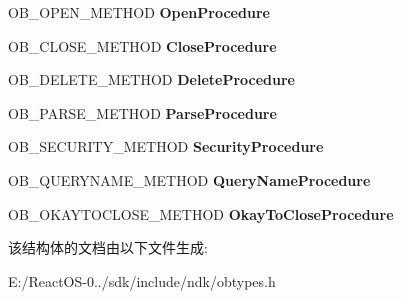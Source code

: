\begin{DoxyCompactItemize}
O\+B\+\_\+\+O\+P\+E\+N\+\_\+\+M\+E\+T\+H\+OD {\bfseries Open\+Procedure}
\item 
\mbox{\label{struct___o_b_j_e_c_t___t_y_p_e___i_n_i_t_i_a_l_i_z_e_r_a4643abc4b98e2807a7f2d333fb2a2d1c}} 
O\+B\+\_\+\+C\+L\+O\+S\+E\+\_\+\+M\+E\+T\+H\+OD {\bfseries Close\+Procedure}
\item 
\mbox{\label{struct___o_b_j_e_c_t___t_y_p_e___i_n_i_t_i_a_l_i_z_e_r_a71cf5c7097be34be270f26d78a75babd}} 
O\+B\+\_\+\+D\+E\+L\+E\+T\+E\+\_\+\+M\+E\+T\+H\+OD {\bfseries Delete\+Procedure}
\item 
\mbox{\label{struct___o_b_j_e_c_t___t_y_p_e___i_n_i_t_i_a_l_i_z_e_r_aa866220e8c0d7bac696674436b2c4670}} 
O\+B\+\_\+\+P\+A\+R\+S\+E\+\_\+\+M\+E\+T\+H\+OD {\bfseries Parse\+Procedure}
\item 
\mbox{\label{struct___o_b_j_e_c_t___t_y_p_e___i_n_i_t_i_a_l_i_z_e_r_a50720426760a9b38eb8ff9e5848cf163}} 
O\+B\+\_\+\+S\+E\+C\+U\+R\+I\+T\+Y\+\_\+\+M\+E\+T\+H\+OD {\bfseries Security\+Procedure}
\item 
\mbox{\label{struct___o_b_j_e_c_t___t_y_p_e___i_n_i_t_i_a_l_i_z_e_r_a9adb3498963a037ee98e7c6b1054438b}} 
O\+B\+\_\+\+Q\+U\+E\+R\+Y\+N\+A\+M\+E\+\_\+\+M\+E\+T\+H\+OD {\bfseries Query\+Name\+Procedure}
\item 
\mbox{\label{struct___o_b_j_e_c_t___t_y_p_e___i_n_i_t_i_a_l_i_z_e_r_aca17e05f05dab53728cabe9df7fd3aa3}} 
O\+B\+\_\+\+O\+K\+A\+Y\+T\+O\+C\+L\+O\+S\+E\+\_\+\+M\+E\+T\+H\+OD {\bfseries Okay\+To\+Close\+Procedure}
\end{DoxyCompactItemize}


该结构体的文档由以下文件生成\+:\begin{DoxyCompactItemize}
\item 
E\+:/\+React\+O\+S-\/0../sdk/include/ndk/obtypes.\+h\end{DoxyCompactItemize}
